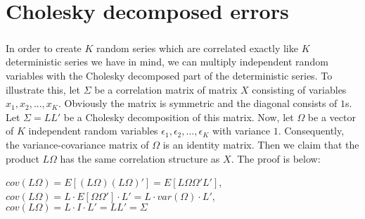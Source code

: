 \chapter{Cholesky decomposed errors}
\label{appa}

\paragraph*{}In order to create $K$ random series which are correlated exactly like $K$ deterministic series we have in mind, we can multiply independent random variables with the Cholesky decomposed part of the deterministic series. To illustrate this, let $\Sigma$ be a correlation matrix of matrix $X$ consisting of variables $x_1, x_2, ..., x_K$. Obviously the matrix is symmetric and the diagonal consists of $1$s. Let $\Sigma = LL'$ be a Cholesky decomposition of this matrix. Now, let $\Omega$ be a vector of $K$ independent random variables $\epsilon_1, \epsilon_2, ..., \epsilon_K$ with variance $1$. Consequently, the variance-covariance matrix of $\Omega$ is an identity matrix. Then we claim that the product $L\Omega$ has the same correlation structure as $X$. The proof is below:

\begin{center}
  $cov(L\Omega) = E[(L\Omega)(L\Omega)'] = E[L\Omega\Omega'L']$,\\
  $cov(L\Omega) = L \cdot E[\Omega\Omega'] \cdot L' = L \cdot var(\Omega) \cdot L'$,\\
  $cov(L\Omega) = L\cdot I \cdot L' = LL' = \Sigma$
\end{center}
